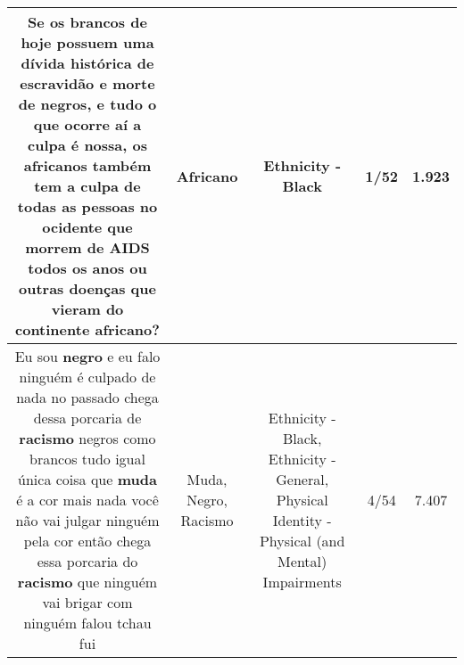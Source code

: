 \documentclass[11pt]{article}
\newlength\mylength
\begin{document}
\begin{center}
\begin{longtable}{|C{.65\mylength}|C{.30\mylength}|C{.12\mylength}|C{.12\mylength}|C{.12\mylength}|}
  \small Se os brancos de hoje possuem uma dívida histórica de escravidão e morte de negros, e tudo o que ocorre aí a culpa é nossa, os africanos também tem a culpa de todas as pessoas no ocidente que morrem de AIDS todos os anos ou outras doenças que vieram do continente \textbf{africano}?\normalsize   & Africano & Ethnicity - Black & 1/52 & 1.923 \\  \hline
  \small Eu sou \textbf{negro} e eu falo ninguém é culpado de nada no passado chega dessa porcaria de \textbf{racismo} negros como brancos tudo igual única coisa que \textbf{muda} é a cor mais nada você não vai julgar ninguém pela cor então chega essa porcaria do \textbf{racismo} que ninguém vai brigar com ninguém falou tchau fui\normalsize   & Muda, Negro, Racismo & Ethnicity - Black, Ethnicity - General, Physical Identity - Physical (and Mental) Impairments & 4/54 & 7.407 \\  \hline
  
\end{longtable}
\end{center}
\end{document}
